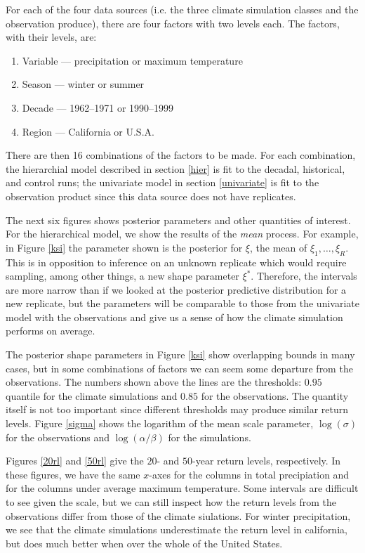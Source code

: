 \documentclass[12pt]{article}
\begin{document}
For each of the four data sources (i.e. the three climate simulation classes and the observation produce), there are four factors with two levels each. The factors, with their levels, are:
\begin{enumerate}
\item Variable --- precipitation or maximum temperature
\item Season --- winter or summer
\item Decade --- 1962--1971 or 1990--1999
\item Region --- California or U.S.A.
\end{enumerate}
There are then 16 combinations of the factors to be made. For each combination, the hierarchial model described in section \ref{hier} is fit to the decadal, historical, and control runs; the univariate model in section \ref{univariate} is fit to the observation product since this data source does not have replicates.

The next six figures shows posterior parameters and other quantities of interest. For the hierarchical model, we show the results of the \emph{mean} process. For example, in Figure \ref{ksi} the parameter shown is the posterior for $\xi$, the mean of $\xi_1,\ldots,\xi_R$. This is in opposition to inference on an unknown replicate which would require sampling, among other things, a new shape parameter $\xi^*$. Therefore, the intervals are more narrow than if we looked at the posterior predictive distribution for a new replicate, but the parameters will be comparable to those from the univariate model with the observations and give us a sense of how the climate simulation performs on average.

The posterior shape parameters in Figure \ref{ksi} show overlapping bounds in many cases, but in some combinations of factors we can seem some departure from the observations. The numbers shown above the lines are the thresholds: $0.95$ quantile for the climate simulations and $0.85$ for the observations. The quantity itself is not too important since different thresholds may produce similar return levels. Figure \ref{sigma} shows the logarithm of the mean scale parameter, $\log(\sigma)$ for the observations and $\log(\alpha/\beta)$ for the simulations.

Figures \ref{20rl} and \ref{50rl} give the $20$- and $50$-year return levels, respectively. In these figures, we have the same $x$-axes for the columns in total precipiation and for the columns under average maximum temperature. Some intervals are difficult to see given the scale, but we can still inspect how the return levels from the observations differ from those of the climate siulations. For winter precipitation, we see that the climate simulations underestimate the return level in california, but does much better when over the whole of the United States.
\end{document}
